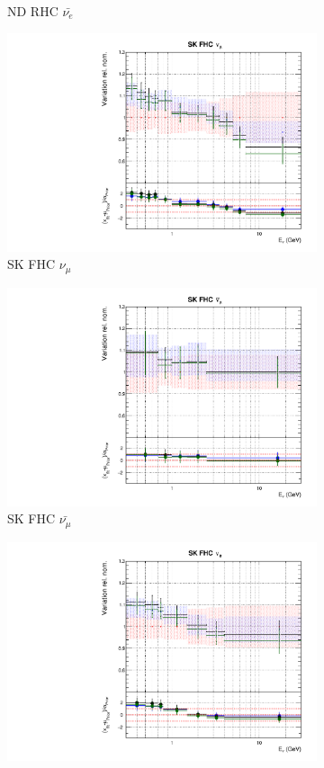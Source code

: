\begin{figure}
\begin{subfigure}{0.24\textwidth}
  \caption{ND RHC $\bar{\nu_{e}}$}
\end{subfigure}
\begin{subfigure}{0.24\textwidth}
  \centering
  \includegraphics[width=0.95\linewidth]{figs/polydataflux_8}
  \caption{SK FHC $\nu_{\mu}$}
\end{subfigure}
\begin{subfigure}{0.24\textwidth}
  \centering
  \includegraphics[width=0.95\linewidth]{figs/polydataflux_9}
  \caption{SK FHC $\bar{\nu_{\mu}}$}
\end{subfigure}
\begin{subfigure}{0.24\textwidth}
  \centering
  \includegraphics[width=0.95\linewidth]{figs/polydataflux_10}

\end{subfigure}
\end{figure}
